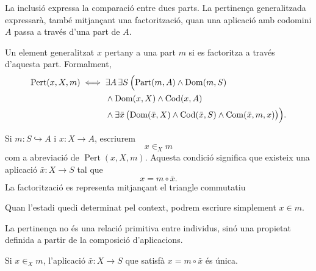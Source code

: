 La inclusió expressa la comparació entre dues parts. La pertinença generalitzada expressarà, també mitjançant una factorització, quan una aplicació amb codomini \(A\) passa a través d'una part de \(A\).

\begin{definicio}[Pertinença]\label{def:pertinenca}
Un element generalitzat \(x\) pertany a una part \(m\) si es factoritza a través d'aquesta part. Formalment,
\[
\begin{aligned}
\operatorname{Pert}(x,X,m)
\iff {}&
\exists A\,\exists S\,\Bigl(
\operatorname{Part}(m,A)
\land\operatorname{Dom}(m,S)
\\
&{}\land\operatorname{Dom}(x,X)\land\operatorname{Cod}(x,A)
\\
&{}\land\exists \bar{x}\,\bigl(
\operatorname{Dom}(\bar{x},X)\land\operatorname{Cod}(\bar{x},S)
\land\operatorname{Com}(\bar{x},m,x)
\bigr)
\Bigr).
\end{aligned}
\]
\end{definicio}

\begin{notacio}\label{not:pertinenca-part}
Si \(m:S\hookrightarrow A\) i \(x:X\to A\), escriurem
\[
x\in_Xm
\]
com a abreviació de \(\operatorname{Pert}(x,X,m)\). Aquesta condició significa que existeix una aplicació \(\bar{x}:X\to S\) tal que
\[
x=m\circ\bar{x}.
\]
La factorització es representa mitjançant el triangle commutatiu
\begin{center}
\end{center}
Quan l'estadi quedi determinat pel context, podrem escriure simplement \(x\in m\).
\end{notacio}

La pertinença no és una relació primitiva entre individus, sinó una propietat definida a partir de la composició d'aplicacions.

\begin{proposicio}\label{prop:testimoni-pertinenca}
Si \(x\in_Xm\), l'aplicació \(\bar{x}:X\to S\) que satisfà \(x=m\circ\bar{x}\) és única.
\end{proposicio}

